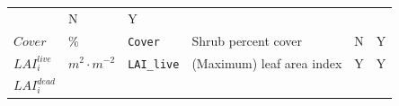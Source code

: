 \documentclass[]{book}
\begin{document}
\begin{longtable}[]{@{}llllll@{}}
\begin{minipage}[t]{0.43\columnwidth}
\end{minipage} & \begin{minipage}[t]{0.07\columnwidth}\raggedright
N\strut
\end{minipage} & \begin{minipage}[t]{0.07\columnwidth}\raggedright
Y\strut
\end{minipage}\tabularnewline
\begin{minipage}[t]{0.10\columnwidth}\raggedright
\(Cover\)\strut
\end{minipage} & \begin{minipage}[t]{0.09\columnwidth}\raggedright
\%\strut
\end{minipage} & \begin{minipage}[t]{0.06\columnwidth}\raggedright
\texttt{Cover}\strut
\end{minipage} & \begin{minipage}[t]{0.43\columnwidth}\raggedright
Shrub percent cover\strut
\end{minipage} & \begin{minipage}[t]{0.07\columnwidth}\raggedright
N\strut
\end{minipage} & \begin{minipage}[t]{0.07\columnwidth}\raggedright
Y\strut
\end{minipage}\tabularnewline
\begin{minipage}[t]{0.10\columnwidth}\raggedright
\(LAI^{live}_i\)\strut
\end{minipage} & \begin{minipage}[t]{0.09\columnwidth}\raggedright
\(m^2 \cdot m^{-2}\)\strut
\end{minipage} & \begin{minipage}[t]{0.06\columnwidth}\raggedright
\texttt{LAI\_live}\strut
\end{minipage} & \begin{minipage}[t]{0.43\columnwidth}\raggedright
(Maximum) leaf area index\strut
\end{minipage} & \begin{minipage}[t]{0.07\columnwidth}\raggedright
Y\strut
\end{minipage} & \begin{minipage}[t]{0.07\columnwidth}\raggedright
Y\strut
\end{minipage}\tabularnewline
\begin{minipage}[t]{0.10\columnwidth}\raggedright
\(LAI^{dead}_i\)\strut
\end{minipage} & \begin{minipage}[t]{0.09\columnwidth}\raggedright

\end{minipage}
\end{longtable}
\end{document}
